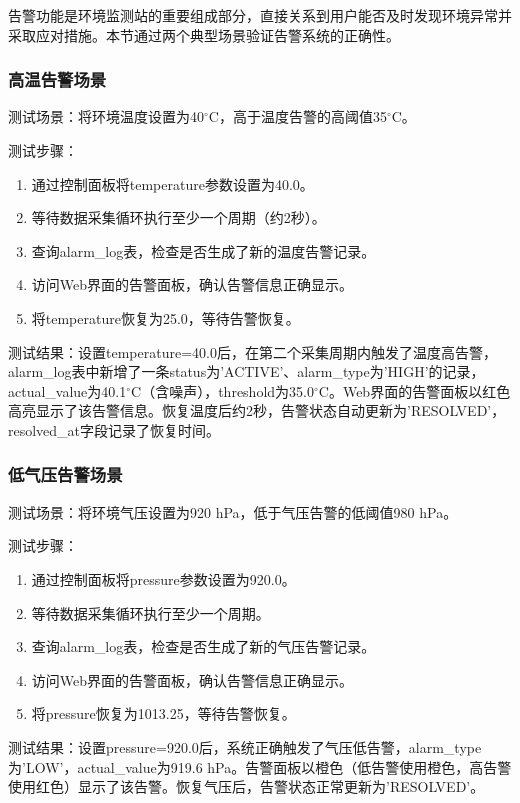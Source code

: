 \documentclass[12pt,a4paper]{ctexart}
\begin{document}
告警功能是环境监测站的重要组成部分，直接关系到用户能否及时发现环境异常并采取应对措施。本节通过两个典型场景验证告警系统的正确性。

\subsubsection{高温告警场景}

测试场景：将环境温度设置为40$^\circ$C，高于温度告警的高阈值35$^\circ$C。

测试步骤：
\begin{enumerate}[leftmargin=2em]
    \item 通过控制面板将temperature参数设置为40.0。
    \item 等待数据采集循环执行至少一个周期（约2秒）。
    \item 查询alarm\_log表，检查是否生成了新的温度告警记录。
    \item 访问Web界面的告警面板，确认告警信息正确显示。
    \item 将temperature恢复为25.0，等待告警恢复。
\end{enumerate}

测试结果：设置temperature=40.0后，在第二个采集周期内触发了温度高告警，alarm\_log表中新增了一条status为'ACTIVE'、alarm\_type为'HIGH'的记录，actual\_value为40.1$^\circ$C（含噪声），threshold为35.0$^\circ$C。Web界面的告警面板以红色高亮显示了该告警信息。恢复温度后约2秒，告警状态自动更新为'RESOLVED'，resolved\_at字段记录了恢复时间。

\subsubsection{低气压告警场景}

测试场景：将环境气压设置为920 hPa，低于气压告警的低阈值980 hPa。

测试步骤：
\begin{enumerate}[leftmargin=2em]
    \item 通过控制面板将pressure参数设置为920.0。
    \item 等待数据采集循环执行至少一个周期。
    \item 查询alarm\_log表，检查是否生成了新的气压告警记录。
    \item 访问Web界面的告警面板，确认告警信息正确显示。
    \item 将pressure恢复为1013.25，等待告警恢复。
\end{enumerate}

测试结果：设置pressure=920.0后，系统正确触发了气压低告警，alarm\_type为'LOW'，actual\_value为919.6 hPa。告警面板以橙色（低告警使用橙色，高告警使用红色）显示了该告警。恢复气压后，告警状态正常更新为'RESOLVED'。
\end{document}
